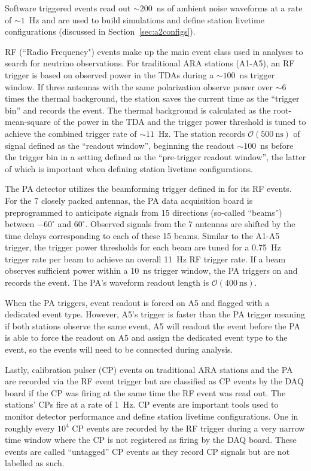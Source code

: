     Software triggered events read out $\sim \! 200$~ns of ambient noise waveforms at a rate of $\sim \! 1$~Hz and are used to build simulations and define station livetime configurations (discussed in Section~\ref{sec:a2configs}).

    RF (``Radio Frequency") events make up the main event class used in analyses to search for neutrino observations.
    For traditional ARA stations (A1-A5), an RF trigger is based on observed power in the TDAs during a $\sim \! 100$~ns trigger window. 
    If three antennas with the same polarization observe power over $\sim  \! 6$ times the thermal background, the station saves the current time as the ``trigger bin'' and records the event.
    The thermal background is calculated as the root-mean-square of the power in the TDA and the trigger power threshold is tuned to achieve the combined trigger rate of $\sim \! 11$~Hz.
    The station records $\mathcal{O}(500~\text{ns})$ of signal defined as the ``readout window'', beginning the readout $\sim \! 100$~ns before the trigger bin in a setting defined as the ``pre-trigger readout window'', the latter of which is important when defining station livetime configurations.

    The PA detector utilizes the beamforming trigger defined in \citep{ara_pa_design} for its RF events. 
    For the 7 closely packed antennas, the PA data acquisition board is preprogrammed to anticipate signals from 15 directions (so-called ``beams'') between $-60^{\circ}$ and $60^{\circ}$.
    Observed signals from the 7 antennas are shifted by the time delays corresponding to each of these 15 beams. 
    Similar to the A1-A5 trigger, the trigger power thresholds for each beam are tuned for a 0.75~Hz trigger rate per beam to achieve an overall 11~Hz RF trigger rate.
    If a beam observes sufficient power within a 10~ns trigger window, the PA triggers on and records the event.
    The PA's waveform readout length is $\mathcal{O}(400~\text{ns})$.

    When the PA triggers, event readout is forced on A5 and flagged with a dedicated event type.
    However, A5's trigger is faster than the PA trigger meaning if both stations observe the same event, A5 will readout the event before the PA is able to force the readout on A5 and assign the dedicated event type to the event, so the events will need to be connected during analysis.

    Lastly, calibration pulser (CP) events on traditional ARA stations and the PA are recorded via the RF event trigger but are classified as CP events by the DAQ board if the CP was firing at the same time the RF event was read out.
    The stations' CPs fire at a rate of 1~Hz.
    CP events are important tools used to monitor detector performance and define station livetime configurations.
    One in roughly every $10^4$ CP events are recorded by the RF trigger during a very narrow time window where the CP is not registered as firing by the DAQ board. 
    These events are called ``untagged'' CP events as they record CP signals but are not labelled as such.

